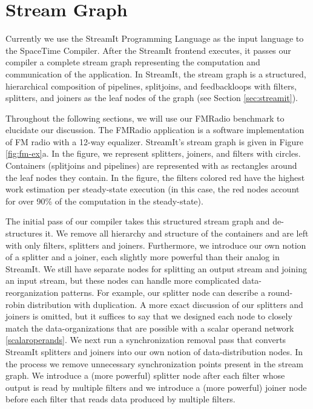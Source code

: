\section{Stream Graph} 

\begin{figure*}
\centering
{}
\caption{FMRadio with a 12-way equalizer after the passes of the
SpaceTime Compiler.
\protect\label{fig:fm-ex}}
\end{figure*}

Currently we use the StreamIt Programming Language as the input
language to the SpaceTime Compiler. After the StreamIt frontend
executes, it passes our compiler a complete stream graph representing
the computation and communication of the application.  In StreamIt,
the stream graph is a structured, hierarchical composition of
pipelines, splitjoins, and feedbackloops with filters, splitters, and
joiners as the leaf nodes of the graph (see Section
\ref{sec:streamit}).  

Throughout the following sections, we will use our FMRadio benchmark
to elucidate our discussion.  The FMRadio application is a software
implementation of FM radio with a 12-way equalizer.  StreamIt's stream
graph is given in Figure \ref{fig:fm-ex}a.  In the figure, we
represent splitters, joiners, and filters with circles.  Containers
(splitjoins and pipelines) are represented with as rectangles around
the leaf nodes they contain.  In the figure, the filters colored red
have the highest work estimation per steady-state execution (in this
case, the red nodes account for over 90\% of the computation in the
steady-state).

The initial pass of our compiler takes this structured stream graph
and de-structures it.  We remove all hierarchy and structure of the
containers and are left with only filters, splitters and joiners.
Furthermore, we introduce our own notion of a splitter and a joiner,
each slightly more powerful than their analog in StreamIt.  We still
have separate nodes for splitting an output stream and joining an
input stream, but these nodes can handle more complicated
data-reorganization patterns.  For example, our splitter node can
describe a round-robin distribution with duplication.  A more exact
discussion of our splitters and joiners is omitted, but it suffices to
say that we designed each node to closely match the data-organizations
that are possible with a scalar operand network \ref{scalaroperands}.
We next run a synchronization removal pass that converts StreamIt
splitters and joiners into our own notion of data-distribution nodes.
In the process we remove unnecessary synchronization points present in
the stream graph.  We introduce a (more powerful) splitter node after
each filter whose output is read by multiple filters and we introduce
a (more powerful) joiner node before each filter that reads data
produced by multiple filters.


